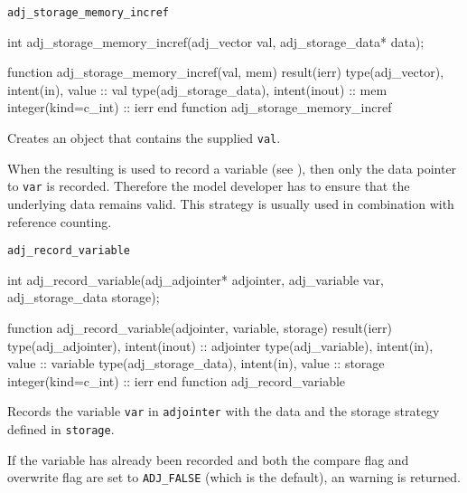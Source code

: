 \begin{boxwithtitle}{\texttt{adj_storage_memory_incref}}
\begin{minipage}{\columnwidth}
\begin{ccode}
  int adj_storage_memory_incref(adj_vector val, adj_storage_data* data);
\end{ccode}
\begin{fortrancode}
  function adj_storage_memory_incref(val, mem) result(ierr)
    type(adj_vector), intent(in), value :: val
    type(adj_storage_data), intent(inout) :: mem
    integer(kind=c_int) :: ierr
  end function adj_storage_memory_incref
\end{fortrancode}
\end{minipage}
\end{boxwithtitle}

Creates an  object that contains the supplied  \texttt{val}.

When the resulting  is used to record a variable (see ), 
then only the data pointer to \texttt{var} is recorded.
Therefore the model developer has to ensure that the underlying data remains valid.
This strategy is usually used in combination with reference counting.


\begin{boxwithtitle}{\texttt{adj_record_variable}}
\begin{minipage}{\columnwidth}
\begin{ccode}
  int adj_record_variable(adj_adjointer* adjointer, adj_variable var, 
                          adj_storage_data storage);
\end{ccode}
\begin{fortrancode}
  function adj_record_variable(adjointer, variable, storage) result(ierr) 
    type(adj_adjointer), intent(inout) :: adjointer
    type(adj_variable), intent(in), value :: variable
    type(adj_storage_data), intent(in), value :: storage
    integer(kind=c_int) :: ierr
  end function adj_record_variable
\end{fortrancode}
\end{minipage}
\end{boxwithtitle}

Records the variable \texttt{var} in \texttt{adjointer} with the data and the storage strategy defined in \texttt{storage}.

If the variable has already been recorded and both the compare flag and overwrite flag are set to \texttt{ADJ_FALSE} (which is the default), an  warning is returned.


